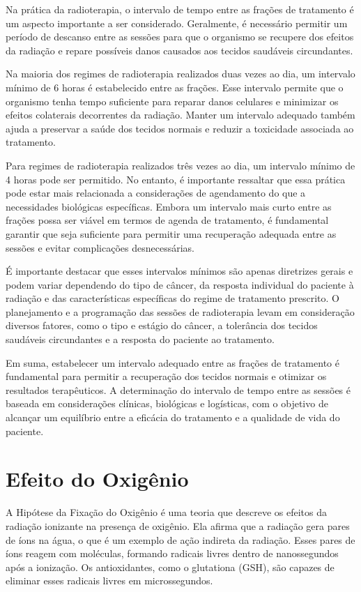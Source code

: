 \documentclass[11pt,a4paper]{article}
\newcounter{exemplo}
\begin{document}
	Na prática da radioterapia, o intervalo de tempo entre as frações de tratamento é um aspecto importante a ser considerado. Geralmente, é necessário permitir um período de descanso entre as sessões para que o organismo se recupere dos efeitos da radiação e repare possíveis danos causados aos tecidos saudáveis circundantes.

	Na maioria dos regimes de radioterapia realizados duas vezes ao dia, um intervalo mínimo de 6 horas é estabelecido entre as frações. Esse intervalo permite que o organismo tenha tempo suficiente para reparar danos celulares e minimizar os efeitos colaterais decorrentes da radiação. Manter um intervalo adequado também ajuda a preservar a saúde dos tecidos normais e reduzir a toxicidade associada ao tratamento.

	Para regimes de radioterapia realizados três vezes ao dia, um intervalo mínimo de 4 horas pode ser permitido. No entanto, é importante ressaltar que essa prática pode estar mais relacionada a considerações de agendamento do que a necessidades biológicas específicas. Embora um intervalo mais curto entre as frações possa ser viável em termos de agenda de tratamento, é fundamental garantir que seja suficiente para permitir uma recuperação adequada entre as sessões e evitar complicações desnecessárias.

	É importante destacar que esses intervalos mínimos são apenas diretrizes gerais e podem variar dependendo do tipo de câncer, da resposta individual do paciente à radiação e das características específicas do regime de tratamento prescrito. O planejamento e a programação das sessões de radioterapia levam em consideração diversos fatores, como o tipo e estágio do câncer, a tolerância dos tecidos saudáveis circundantes e a resposta do paciente ao tratamento.

	Em suma, estabelecer um intervalo adequado entre as frações de tratamento é fundamental para permitir a recuperação dos tecidos normais e otimizar os resultados terapêuticos. A determinação do intervalo de tempo entre as sessões é baseada em considerações clínicas, biológicas e logísticas, com o objetivo de alcançar um equilíbrio entre a eficácia do tratamento e a qualidade de vida do paciente.

\section{Efeito do Oxigênio}

	
	A Hipótese da Fixação do Oxigênio é uma teoria que descreve os efeitos da radiação ionizante na presença de oxigênio. Ela afirma que a radiação gera pares de íons na água, o que é um exemplo de ação indireta da radiação. Esses pares de íons reagem com moléculas, formando radicais livres dentro de nanossegundos após a ionização. Os antioxidantes, como o glutationa (GSH), são capazes de eliminar esses radicais livres em microssegundos.
\end{document}
